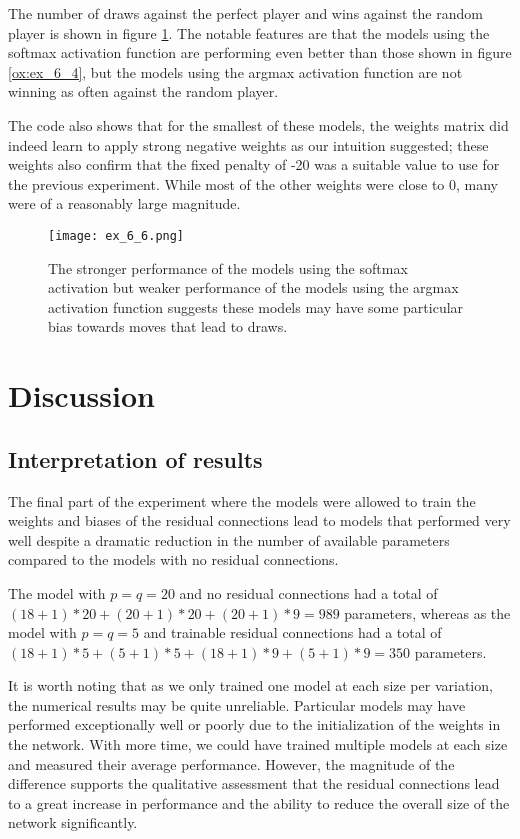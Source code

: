 \documentclass{somasmsc}
\begin{document}
\begin{exa}
The number of draws against the perfect player and wins against the random player is shown in figure \ref{ox:ex_6_6}. The notable features are that the models using the softmax activation function are performing even better than those shown in figure \ref{ox:ex_6_4}, but the models using the argmax activation function are not winning as often against the random player.

The code also shows that for the smallest of these models, the weights matrix did indeed learn to apply strong negative weights as our intuition suggested; these weights also confirm that the fixed penalty of -20 was a suitable value to use for the previous experiment. While most of the other weights were close to 0, many were of a reasonably large magnitude.

\begin{figure}[H]\label{ox:ex_6_6}
\begin{center}
\texttt{[image: ex\_6\_6.png]}
\end{center}
\caption{The stronger performance of the models using the softmax activation but weaker performance of the models using the argmax activation function suggests these models may have some particular bias towards moves that lead to draws.}
\end{figure}
\end{exa}

\section{Discussion}

\subsection{Interpretation of results}

The final part of the experiment where the models were allowed to train the weights and biases of the residual connections lead to models that performed very well despite a dramatic reduction in the number of available parameters compared to the models with no residual connections.

The model with $p=q=20$ and no residual connections had a total of $\left(18+1\right)*20+\left(20+1\right)*20+\left(20+1\right)*9=989$ parameters, whereas as the model with $p=q=5$ and trainable residual connections had a total of $\left(18+1\right)*5+\left(5+1\right)*5+\left(18+1\right)*9+\left(5+1\right)*9=350$ parameters.

It is worth noting that as we only trained one model at each size per variation, the numerical results may be quite unreliable. Particular models may have performed exceptionally well or poorly due to the initialization of the weights in the network. With more time, we could have trained multiple models at each size and measured their average performance. However, the magnitude of the difference supports the qualitative assessment that the residual connections lead to a great increase in performance and the ability to reduce the overall size of the network significantly.
\end{document}
